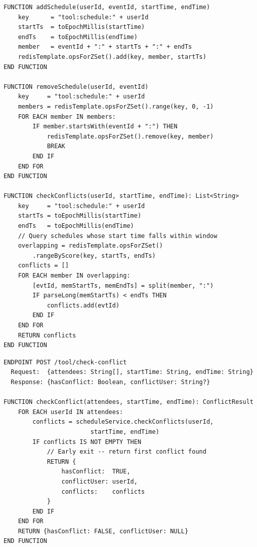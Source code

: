 \begin{table}[H]
\small\singlespacing
\centering
\caption{Pseudocode --- Redis Sorted Set Schedule Operations (add / remove / checkConflicts)}
\label{tab:pseudocode-redis-schedule}
\vspace{2mm}

\begin{lstlisting}
FUNCTION addSchedule(userId, eventId, startTime, endTime)
    key      = "tool:schedule:" + userId
    startTs  = toEpochMillis(startTime)
    endTs    = toEpochMillis(endTime)
    member   = eventId + ":" + startTs + ":" + endTs
    redisTemplate.opsForZSet().add(key, member, startTs)
END FUNCTION

FUNCTION removeSchedule(userId, eventId)
    key     = "tool:schedule:" + userId
    members = redisTemplate.opsForZSet().range(key, 0, -1)
    FOR EACH member IN members:
        IF member.startsWith(eventId + ":") THEN
            redisTemplate.opsForZSet().remove(key, member)
            BREAK
        END IF
    END FOR
END FUNCTION

FUNCTION checkConflicts(userId, startTime, endTime): List<String>
    key     = "tool:schedule:" + userId
    startTs = toEpochMillis(startTime)
    endTs   = toEpochMillis(endTime)
    // Query schedules whose start time falls within window
    overlapping = redisTemplate.opsForZSet()
        .rangeByScore(key, startTs, endTs)
    conflicts = []
    FOR EACH member IN overlapping:
        [evtId, memStartTs, memEndTs] = split(member, ":")
        IF parseLong(memStartTs) < endTs THEN
            conflicts.add(evtId)
        END IF
    END FOR
    RETURN conflicts
END FUNCTION
\end{lstlisting}
\end{table}


\vspace{3mm}

\begin{table}[H]
\small\singlespacing
\centering
\caption{Pseudocode --- POST /tool/check-conflict Attendee-Based Conflict Workflow}
\label{tab:pseudocode-check-conflict}
\vspace{2mm}

\begin{lstlisting}
ENDPOINT POST /tool/check-conflict
  Request:  {attendees: String[], startTime: String, endTime: String}
  Response: {hasConflict: Boolean, conflictUser: String?}

FUNCTION checkConflict(attendees, startTime, endTime): ConflictResult
    FOR EACH userId IN attendees:
        conflicts = scheduleService.checkConflicts(userId,
                        startTime, endTime)
        IF conflicts IS NOT EMPTY THEN
            // Early exit -- return first conflict found
            RETURN {
                hasConflict:  TRUE,
                conflictUser: userId,
                conflicts:    conflicts
            }
        END IF
    END FOR
    RETURN {hasConflict: FALSE, conflictUser: NULL}
END FUNCTION
\end{lstlisting}
\end{table}


